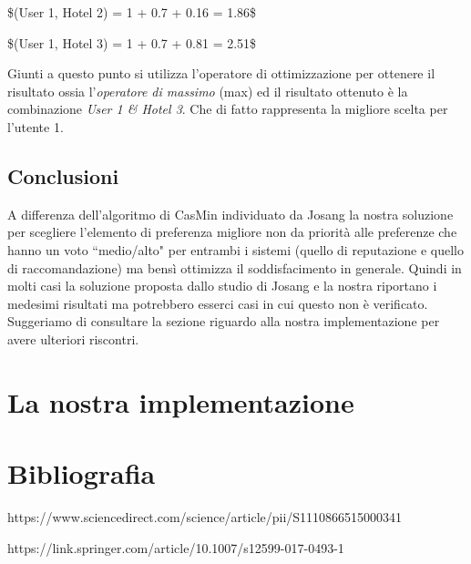 \documentclass{report}
\begin{document}
	\$(User 1, Hotel 2) = 1 + 0.7 + 0.16 = 1.86\$
	
	\$(User 1, Hotel 3) = 1 + 0.7 + 0.81 = 2.51\$
	
	Giunti a questo punto si utilizza l'operatore di ottimizzazione per
	ottenere il risultato ossia l'\emph{operatore di massimo} (max) ed il
	risultato ottenuto è la combinazione \emph{User 1 \& Hotel 3}. Che di
	fatto rappresenta la migliore scelta per l'utente 1.
	
	\hypertarget{header-n280}{%
		\subsection{Conclusioni}\label{header-n280}}
	
	A differenza dell'algoritmo di CasMin individuato da Josang la nostra
	soluzione per scegliere l'elemento di preferenza migliore non da
	priorità alle preferenze che hanno un voto ``medio/alto" per entrambi i
	sistemi (quello di reputazione e quello di raccomandazione) ma bensì
	ottimizza il soddisfacimento in generale. Quindi in molti casi la
	soluzione proposta dallo studio di Josang e la nostra riportano i
	medesimi risultati ma potrebbero esserci casi in cui questo non è
	verificato. Suggeriamo di consultare la sezione riguardo alla nostra
	implementazione per avere ulteriori riscontri.
	
	\hypertarget{header-n284}{%
		\section{La nostra implementazione}\label{header-n284}}
	
	\hypertarget{header-n287}{%
		\section{Bibliografia}\label{header-n287}}
	
	https://www.sciencedirect.com/science/article/pii/S1110866515000341
	
	https://link.springer.com/article/10.1007/s12599-017-0493-1
	
\end{document}

